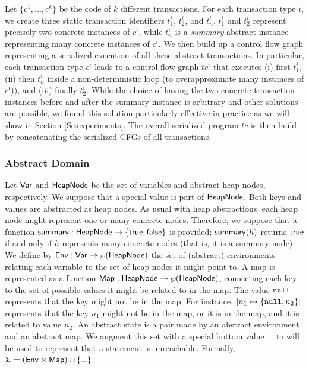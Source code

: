 Let $\{c^1, ..., c^k\}$ be the code of $k$ different transactions. For each transaction type $i$, we create three static transaction identifiers $t^i_1$, $t^i_2$, and $t^i_n$. $t^i_1$ and $t^i_2$ represent precisely two concrete instances of $c^i$, while $t^i_n$ is a \emph{summary} abstract instance representing many concrete instances of $c^i$. We then build up a control flow graph representing a serialized execution of all these abstract transactions. In particular, each transaction type $c^i$ leads to a control flow graph $tc^i$ that executes (i) first $t^i_1$, (ii) then $t^i_n$ inside a non-deterministic loop (to overapproximate many instances of $c^i$)), and (iii) finally $t^i_2$. While the choice of having the two concrete transaction instances before and after the summary instance is arbitrary and other solutions are possible, we found this solution particularly effective in practice as we will show in Section \ref{Se:experiments}. The overall serialized program $tc$ is then build by concatenating the serialized CFGs of all transactions.


\subsubsection{Abstract Domain}
\label{sect:abstractate}

Let $\mathsf{Var}$ and $\mathsf{HeapNode}$ be the set of variables and abstract heap nodes, respectively. We suppose that a special  value is part of $\mathsf{HeapNode}$. Both keys and values are abstracted as heap nodes. As usual with heap abstractions, each heap node might represent one or many concrete nodes. Therefore, we suppose that a function $\mathsf{summary} : \mathsf{HeapNode} \to \{\mathsf{true}, \mathsf{false}\}$ is provided; $\mathsf{summary}(h)$ returns $\mathsf{true}$ if and only if $h$ represents many concrete nodes (that is, it is a summary node). We define by $\mathsf{Env} : \mathsf{Var} \to \wp(\mathsf{HeapNode})$ the set of (abstract) environments relating each variable to the set of heap nodes it might point to. A map is represented as a function $\mathsf{Map} : \mathsf{HeapNode} \to \wp(\mathsf{HeapNode})$, connecting each key to the set of possible values it might be related to in the map. The value $\mathtt{null}$ represents that the key might not be in the map. For instance, $[n_1 \mapsto \{\mathtt{null}, n_2\}]$ represents that the key $n_1$ might not be in the map, or it is in the map, and it is related to value $n_2$. An abstract state is a pair made by an abstract environment and an abstract map. We augment this set with a special bottom value $\bot$ to will be used to represent that a statement is unreachable. Formally, $\mathsf{\Sigma} = (\mathsf{Env} \times \mathsf{Map}) \cup \{\bot\}$.

